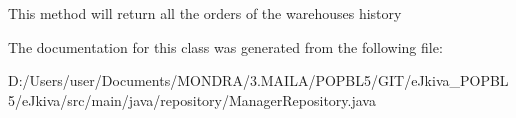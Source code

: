 This method will return all the orders of the warehouse\textquotesingle{}s history 

The documentation for this class was generated from the following file\+:\begin{DoxyCompactItemize}
\item 
D\+:/\+Users/user/\+Documents/\+M\+O\+N\+D\+R\+A/3.\+M\+A\+I\+L\+A/\+P\+O\+P\+B\+L5/\+G\+I\+T/e\+Jkiva\+\_\+\+P\+O\+P\+B\+L5/e\+Jkiva/src/main/java/repository/Manager\+Repository.\+java\end{DoxyCompactItemize}
